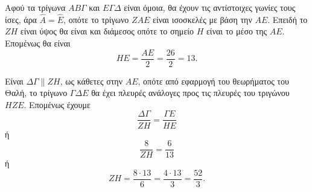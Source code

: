 \begin{alist}
\begin{figure}
    \end{figure}
    \item [γ)]
    \begin{rlist}
        \item Αφού τα τρίγωνα $ΑΒΓ$ και $ΕΓΔ$ είναι όμοια, θα έχουν τις αντίστοιχες γωνίες τους ίσες, άρα $\hat{Α} = \hat{Ε}$, οπότε το τρίγωνο $ΖΑΕ$ είναι ισοσκελές με βάση την $ΑΕ$. Επειδή το $ΖΗ$ είναι ύψος θα είναι και διάμεσος οπότε το σημείο $Η$ είναι το μέσο της $ΑΕ$. Επομένως θα είναι
        \[ ΗΕ = \frac{ΑΕ}{2} = \frac{26}{2} = 13. \]
        \item Είναι $ΔΓ \parallel ΖΗ$, ως κάθετες στην $ΑΕ$, οπότε από εφαρμογή του θεωρήματος του Θαλή, το τρίγωνο $ΓΔΕ$ θα έχει πλευρές ανάλογες προς τις πλευρές του τριγώνου $ΗΖΕ$. Επομένως έχουμε
        \[ \frac{ΔΓ}{ΖΗ} = \frac{ΓΕ}{ΗΕ} \]
        ή
        \[ \frac{8}{ΖΗ} = \frac{6}{13} \]
        ή
        \[ ΖΗ = \frac{8 \cdot 13}{6} = \frac{4 \cdot 13}{3} = \frac{52}{3}. \]
    \end{rlist}
\end{alist}